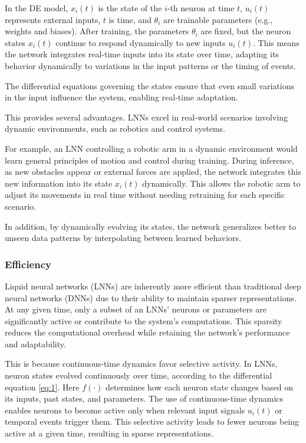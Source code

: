 In the DE model, \(x_i(t)\) is the state of the \(i\)-th neuron at time \(t\), \(u_i(t)\) represents external inputs, \(t\) is time, and \(\theta_i\) are trainable parameters (e.g., weights and biases). After training, the parameters \(\theta_i\) are fixed, but the neuron states \(x_i(t)\) continue to respond dynamically to new inputs \(u_i(t)\). This means the network integrates real-time inputs into its state over time, adapting its behavior dynamically to variations in the input patterns or the timing of events.

The differential equations governing the states ensure that even small variations in the input influence the system, enabling real-time adaptation.

This provides several advantages. LNNs excel in real-world scenarios involving dynamic environments, such as robotics \cite{chahineRobustFlightNavigation2023} and control systems.

For example, an LNN controlling a robotic arm in a dynamic environment would learn general principles of motion and control during training. During inference, as new obstacles appear or external forces are applied, the network integrates this new information into its state \(x_i(t)\) dynamically. This allows the robotic arm to adjust its movements in real time without needing retraining for each specific scenario.

In addition, by dynamically evolving its states, the network generalizes better to unseen data patterns by interpolating between learned behaviors.

\subsubsection{Efficiency}
Liquid neural networks (LNNs) are inherently more efficient than traditional deep neural networks (DNNs) due to their ability to maintain sparser representations. At any given time, only a subset of an LNNs' neurons or parameters are significantly active or contribute to the system's computations. This sparsity reduces the computational overhead while retaining the network's performance and adaptability.

This is because continuous-time dynamics favor selective activity. In LNNs, neuron states evolved continuously over time, according to the differential equation \ref{eq:1}. Here \(f(\cdot)\) determines how each neuron state changes based on its inputs, past states, and parameters. The use of continuous-time dynamics enables neurons to become active only when relevant input signals \(u_i(t)\) or temporal events trigger them. This selective activity leads to fewer neurons being active at a given time, resulting in sparse representations.

